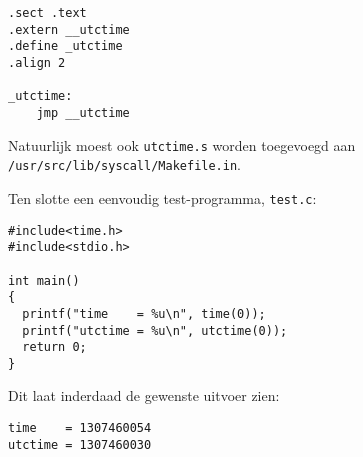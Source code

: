 \documentclass[11pt]{article}
\begin{document}
\begin{verbatim}
.sect .text
.extern __utctime
.define _utctime
.align 2

_utctime:
	jmp __utctime
\end{verbatim}

Natuurlijk moest ook \verb+utctime.s+ worden toegevoegd aan \verb+/usr/src/lib/syscall/Makefile.in+.

Ten slotte een eenvoudig test-programma, \verb+test.c+:

\begin{verbatim}
#include<time.h>
#include<stdio.h>

int main()
{
  printf("time    = %u\n", time(0));
  printf("utctime = %u\n", utctime(0));
  return 0;
}
\end{verbatim}

Dit laat inderdaad de gewenste uitvoer zien:

\begin{verbatim}
time    = 1307460054
utctime = 1307460030
\end{verbatim}
\end{document}
